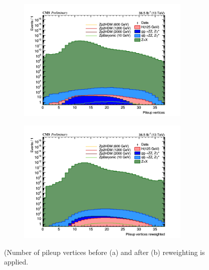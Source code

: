 \begin{figure}[tbh]
\begin{subfigure}{0.5\textwidth}
\centering
\includegraphics[width=3.25in]{figures/hist_hPUvertices.png}
\caption{}
\end{subfigure}
\begin{subfigure}{0.5\textwidth}
\centering
\includegraphics[width=3.25in]{figures/hist_hPUvertices_ReWeighted.png}
\caption{}
\end{subfigure}
\caption{(Number of pileup vertices before (a) and after (b) reweighting is applied.}
\label{fig:pu}
\end{figure}







